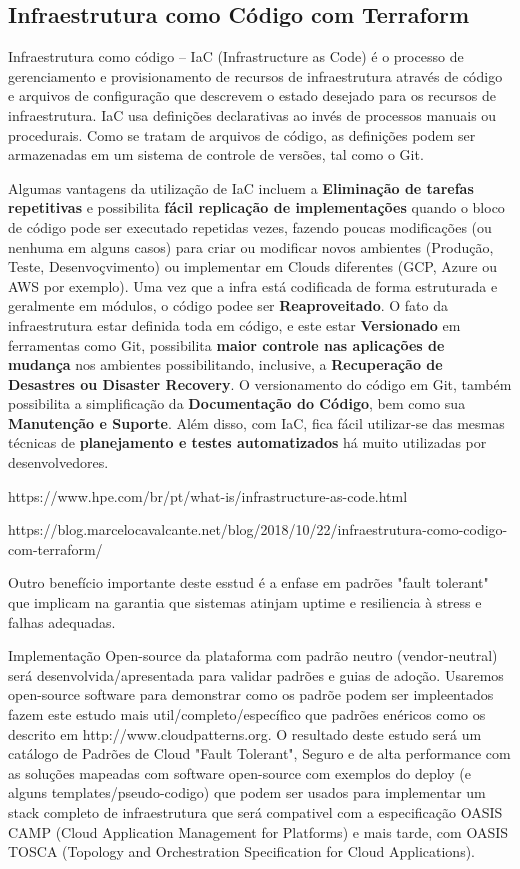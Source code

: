\documentclass[12pt]{article}
\begin{document}
	\subsection{Infraestrutura como Código com Terraform}
	
	Infraestrutura como código – IaC (Infrastructure as Code) é o processo de gerenciamento e provisionamento de recursos de infraestrutura através de código e arquivos de configuração que descrevem o estado desejado para os recursos de infraestrutura. IaC usa definições declarativas ao invés de processos manuais ou procedurais. Como se tratam de arquivos de código, as definições podem ser armazenadas em um sistema de controle de versões, tal como o Git.
	
	Algumas vantagens da utilização de IaC incluem a \textbf{Eliminação de tarefas repetitivas} e possibilita \textbf{fácil replicação de implementações} quando o bloco de código pode ser executado repetidas vezes, fazendo poucas modificações (ou nenhuma em alguns casos) para criar ou modificar novos ambientes (Produção, Teste, Desenvoçvimento) ou implementar em Clouds diferentes (GCP, Azure ou AWS por exemplo). Uma vez que a infra está codificada de forma estruturada e geralmente em módulos, o código podee ser \textbf{Reaproveitado}. O fato da infraestrutura estar definida toda em código, e este estar \textbf{Versionado} em ferramentas como Git, possibilita \textbf{maior controle nas aplicações de mudança} nos ambientes possibilitando, inclusive, a \textbf{Recuperação de Desastres ou Disaster Recovery}. O versionamento do código em Git, também possibilita a simplificação da \textbf{Documentação do Código}, bem como sua \textbf{Manutenção e Suporte}. Além disso, com IaC, fica fácil utilizar-se das mesmas técnicas de \textbf{planejamento e testes automatizados} há muito utilizadas por desenvolvedores.
	
	
	https://www.hpe.com/br/pt/what-is/infrastructure-as-code.html	
	
	https://blog.marcelocavalcante.net/blog/2018/10/22/infraestrutura-como-codigo-com-terraform/
	

	Outro benefício importante deste esstud é a enfase em padrões "fault tolerant" que implicam na garantia que sistemas atinjam uptime e resiliencia à stress e falhas adequadas. 
	
	Implementação Open-source da plataforma com padrão neutro (vendor-neutral) será desenvolvida/apresentada para validar padrões e guias de adoção. Usaremos open-source software para demonstrar como os padrõe podem ser impleentados fazem este estudo mais util/completo/específico que padrões enéricos como os descrito em http://www.cloudpatterns.org.
	O resultado deste estudo será um catálogo de Padrões de Cloud "Fault Tolerant", Seguro e de alta performance com as soluções mapeadas com software open-source com exemplos do deploy (e alguns templates/pseudo-codigo) que podem ser usados para implementar um stack completo de infraestrutura que será compativel com a especificação OASIS CAMP (Cloud Application Management for Platforms) e mais tarde, com OASIS TOSCA (Topology and Orchestration Specification for Cloud Applications).
	
\end{document}

